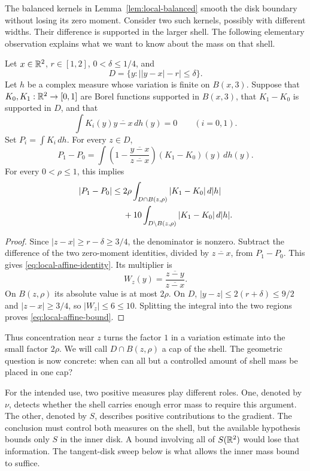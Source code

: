 The balanced kernels in Lemma~\ref{lem:local-balanced} smooth the disk
boundary without losing its zero moment. Consider two such kernels,
possibly with different widths. Their difference is supported in the
larger shell. The following elementary observation explains what we
want to know about the mass on that shell.

\begin{lemma}\label{lem:local-affine}
Let $x\in\mathbb R^2$, $r\in[1,2]$, $0<\delta\le1/4$, and
\[
 D=\{y:\bigl||y-x|-r\bigr|\le\delta\}.
\]
Let $h$ be a complex measure whose variation is finite on $B(x,3)$.
Suppose that $K_0,K_1:\mathbb R^2\to[0,1]$ are Borel functions supported in
$B(x,3)$, that $K_1-K_0$ is supported in $D$, and that
\[
 \int K_i(y)\overline{y-x}\,dh(y)=0\qquad(i=0,1).
\]
Set $P_i=\int K_i\,dh$. For every $z\in D$,
\begin{equation}\label{eq:local-affine-identity}
 P_1-P_0=\int
 \left(1-\frac{\overline{y-x}}{\overline{z-x}}\right)
 (K_1-K_0)(y)\,dh(y).
\end{equation}
For every $0<\rho\le1$, this implies
\begin{align}\label{eq:local-affine-bound}
 |P_1-P_0|\le{}&2\rho\int_{D\cap B(z,\rho)}
                    |K_1-K_0|\,d|h|\notag\\
 &+10\int_{D\setminus B(z,\rho)}|K_1-K_0|\,d|h|.
\end{align}
\end{lemma}

\begin{proof}
Since $|z-x|\ge r-\delta\ge3/4$, the denominator is nonzero.
Subtract the difference of the two zero-moment identities, divided by
$\overline{z-x}$, from $P_1-P_0$. This gives
\eqref{eq:local-affine-identity}. Its multiplier is
\[
 W_z(y)=\frac{\overline{z-y}}{\overline{z-x}}.
\]
On $B(z,\rho)$ its absolute value is at most $2\rho$. On $D$,
$|y-z|\le2(r+\delta)\le9/2$ and $|z-x|\ge3/4$, so
$|W_z|\le6\le10$. Splitting the integral into the two regions proves
\eqref{eq:local-affine-bound}.
\end{proof}

Thus concentration near $z$ turns the factor $1$ in a variation
estimate into the small factor $2\rho$. We will call
$D\cap B(z,\rho)$ a cap of the shell. The geometric question is now
concrete: when can all but a controlled amount of shell mass be placed
in one cap?

For the intended use, two positive measures play different roles.
One, denoted by $\nu$, detects whether the shell carries enough error
mass to require this argument. The other, denoted by $S$, describes
positive contributions to the gradient. The conclusion must control
both measures on the shell, but the available hypothesis bounds only
$S$ in the inner disk. A bound involving all of $S(\mathbb R^2)$ would lose
that information. The tangent-disk sweep below is what allows the
inner mass bound to suffice.

